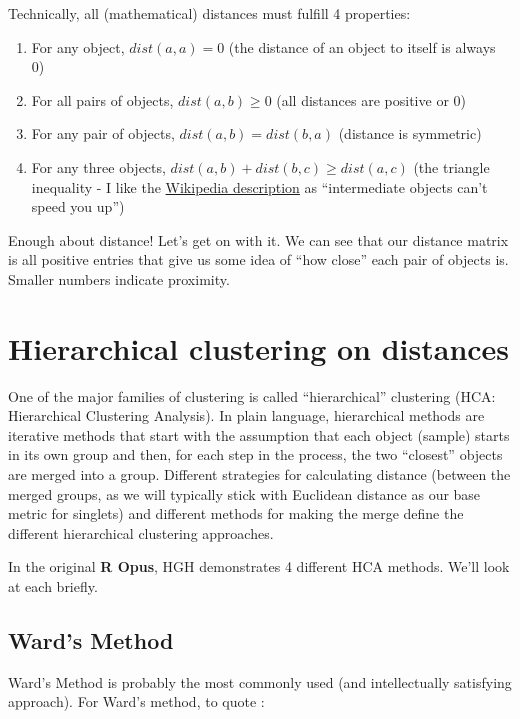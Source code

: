 \documentclass[
]{book}
\providecommand{\tightlist}{%
  \setlength{\itemsep}{0pt}\setlength{\parskip}{0pt}}
\begin{document}
Technically, all (mathematical) distances must fulfill 4 properties:

\begin{enumerate}
\def\labelenumi{\arabic{enumi}.}
\tightlist
\item
  For any object, \(dist(a,a) = 0\) (the distance of an object to itself is always 0)
\item
  For all pairs of objects, \(dist(a,b) ≥ 0\) (all distances are positive or 0)
\item
  For any pair of objects, \(dist(a,b) = dist(b,a)\) (distance is symmetric)
\item
  For any three objects, \(dist(a,b) + dist(b,c) ≥ dist(a,c)\) (the triangle inequality - I like the \href{https://en.wikipedia.org/wiki/Distance\#Mathematical_formalization}{Wikipedia description} as ``intermediate objects can't speed you up'')
\end{enumerate}

Enough about distance! Let's get on with it. We can see that our distance matrix is all positive entries that give us some idea of ``how close'' each pair of objects is. Smaller numbers indicate proximity.

\section{Hierarchical clustering on distances}\label{hierarchical-clustering-on-distances}

One of the major families of clustering is called ``hierarchical'' clustering (HCA: Hierarchical Clustering Analysis). In plain language, hierarchical methods are iterative methods that start with the assumption that each object (sample) starts in its own group and then, for each step in the process, the two ``closest'' objects are merged into a group. Different strategies for calculating distance (between the merged groups, as we will typically stick with Euclidean distance as our base metric for singlets) and different methods for making the merge define the different hierarchical clustering approaches.

In the original \textbf{R Opus}, HGH demonstrates 4 different HCA methods. We'll look at each briefly.

\subsection{Ward's Method}\label{wards-method}

Ward's Method is probably the most commonly used (and intellectually satisfying approach). For Ward's method, to quote \citet[p.466]{rencherMethods2002}:
\end{document}
